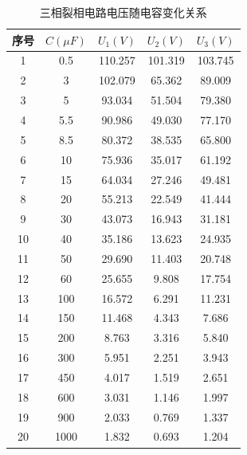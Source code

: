 \documentclass[12pt]{article}%
\begin{document}
\twocolumn
\begin{table}[htbp]
  \centering
  \caption{\heiti{}三相裂相电路电压随电容变化关系}
    \begin{tabular}{ccccc}
    \hline
    序号 & $C(\mu F)$ & $U_1(V)$ & $U_2(V)$ & $U_3(V)$ \\
        \hline
    1  & 0.5 & 110.257  & 101.319  & 103.745  \\
    2  & 3  & 102.079  & 65.362  & 89.009  \\
    3  & 5  & 93.034  & 51.504  & 79.380  \\
    4  & 5.5 & 90.986  & 49.030  & 77.170  \\
    5  & 8.5 & 80.372  & 38.535  & 65.800  \\
    6  & 10 & 75.936  & 35.017  & 61.192  \\
    7  & 15 & 64.034  & 27.246  & 49.481  \\
    8  & 20 & 55.213  & 22.549  & 41.444  \\
    9  & 30 & 43.073  & 16.943  & 31.181  \\
    10 & 40 & 35.186  & 13.623  & 24.935  \\
    11 & 50 & 29.690  & 11.403  & 20.748  \\
    12 & 60 & 25.655  & 9.808  & 17.754  \\
    13 & 100 & 16.572  & 6.291  & 11.231  \\
    14 & 150 & 11.468  & 4.343  & 7.686  \\
    15 & 200 & 8.763  & 3.316  & 5.840  \\
    16 & 300 & 5.951  & 2.251  & 3.943  \\
    17 & 450 & 4.017  & 1.519  & 2.651  \\
    18 & 600 & 3.031  & 1.146  & 1.997  \\
    19 & 900 & 2.033  & 0.769  & 1.337  \\
    20 & 1000 & 1.832  & 0.693  & 1.204  \\
        \hline
    \end{tabular}%
  \label{tab:addlabel23}%
\end{table}%
\end{document}
